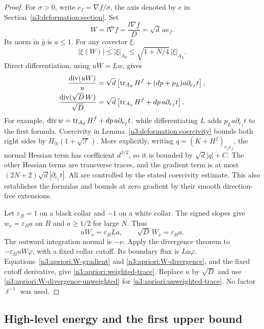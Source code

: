 \begin{proof}
For $\sigma>0$, write $e_f=\nabla f/\sigma$, the axis denoted by
$e$ in Section~\ref{n3:deformation:section}. Set
\[
 W=l\bar\nabla f=\frac{l\nabla f}{D}=\sqrt d\,a e_f.
\]
Its norm in $\bar g$ is $a\le1$.  For any covector $\xi$,
\begin{equation}
 |\xi(W)|\le |\xi|_{A_d}
                  \le\sqrt{1+N/4}\,|\xi|_{A_\chi}.
 \label{n3:apriori:W-gradient}
\end{equation}
Direct differentiation, using $uW=Lw$, gives
\begin{align}
 \frac{\operatorname{div}(uW)}u
 &=\sqrt d\left[
       \operatorname{tr}_{A_d}H^f+(dp+p_L)a\partial_{e_f}t\right],
 \label{n3:apriori:W-divergence}\\
 \frac{\operatorname{div}(\sqrt D\,W)}{\sqrt D}
 &=\sqrt d\left[
       \operatorname{tr}_{A_d}H^f+dp\,a\partial_{e_f}t\right].
 \label{n3:apriori:W-divergence-unweighted}
\end{align}
For example,
$\operatorname{div} w=\operatorname{tr}_{A_d}H^f+dp\,a\partial_{e_f}t$,
while differentiating $L$ adds $p_La\partial_{e_f}t$ to the first
formula.  Coercivity in Lemma~\ref{n3:deformation:coercivity}
bounds both right sides by $\Pi_N(1+\sqrt{\mathcal T})$.
More explicitly, writing $q=(K+H^f)_{e_fe_f}$, the normal Hessian
term has coefficient $d^{3/2}$, so it is bounded by $\sqrt d|q|+C$.
The other Hessian terms are transverse traces, and the gradient
term is at most $(2N+2)\sqrt d|\partial_{e_f}t|$.
All are controlled by the stated coercivity estimate.  This also
establishes the formulas and bounds at zero gradient by their smooth
direction-free extensions.

Let $\varepsilon_B=1$ on a black collar and $-1$ on a white collar.
The signed slopes give $w_\nu=\varepsilon_B a$ on $B$ and
$a\ge1/2$ for large $N$.  Thus
\[
 uW_\nu=\varepsilon_B La,
 \qquad \sqrt D\,W_\nu=\varepsilon_B a.
\]
The outward integration normal is $-\nu$.
Apply the divergence theorem to $-\varepsilon_B uW\varphi$, with
a fixed collar cutoff.  Its boundary flux is $La\varphi$.
Equations~\eqref{n3:apriori:W-gradient} and
\eqref{n3:apriori:W-divergence}, and the fixed cutoff derivative, give
\eqref{n3:apriori:weighted-trace}.  Replace $u$ by $\sqrt D$ and use
\eqref{n3:apriori:W-divergence-unweighted} for
\eqref{n3:apriori:unweighted-trace}.  No factor $\ell^{-1}$ was used.
\end{proof}

\subsection{High-level energy and the first upper bound}

